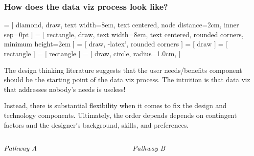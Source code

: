 \documentclass[notes, aspectratio=1610]{beamer}
\begin{document}
\begin{frame}
	\frametitle{How does the data viz process look like?}
	 = [
		diamond,
		draw,  
		text width=8em,
		text centered, 
		node distance=2cm, 
		inner sep=0pt
		]
	 = [
		rectangle, 
		draw,
		text width=8em,
		text centered,
		rounded corners,
		minimum height=2em
		]
	 = [
		draw,
		-latex',
		rounded corners
		]
	 = [
		draw
		]
	 = [
		rectangle
		]
	 = [
		rectangle
		]
	 = [
		draw,
		circle,
		radius=1.0cm,
		]

	The design thinking literature \cite{ware2010} suggests that the user
	needs/benefits component should be the starting point of the data viz process.
	The intuition is that data viz that addresses nobody's needs is useless!

	\vspace{1em}

	Instead, there is substantial flexibility when it comes to fix the design and 
	technology components. Ultimately, the order depends depends on contingent factors
	and the designer's background, skills, and preferences.

	\vspace{1em}

	\begin{columns}
		\begin{column}{0.45\textwidth}
			\emph{Pathway A}

			\vspace{1em}

		\end{column}
		\begin{column}{0.45\textwidth}
			\emph{Pathway B}

			\vspace{1em}



\end{column}
\end{columns}
\end{frame}
\end{document}

